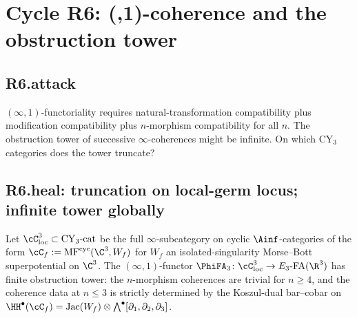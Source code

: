 \section*{Cycle R6: (\infty,1)-coherence and the obstruction tower}

\subsection*{R6.attack}

$(\infty,1)$-functoriality requires natural-transformation compatibility
plus modification compatibility plus $n$-morphism compatibility for all
$n$.  The obstruction tower of successive $\infty$-coherences might be
infinite.  On which CY$_3$ categories does the tower truncate?

\subsection*{R6.heal: truncation on local-germ locus; infinite tower globally}

\begin{proposition}
\label{prop:obstruction-tower-truncation-local}
\ClaimStatusProvedHere
Let $\cC_{\mathrm{loc}}^3 \subset \mathrm{CY}_3\text{-cat}$ be the
full $\infty$-subcategory on cyclic $\Ainf$-categories of the form
$\cC_f := \mathrm{MF}^{\mathrm{cyc}}(\C^3, W_f)$ for $W_f$ an
isolated-singularity Morse--Bott superpotential on $\C^3$.  The
$(\infty,1)$-functor $\PhiFA_3
\colon \cC_{\mathrm{loc}}^3 \to E_3\text{-FA}(\R^3)$ has finite
obstruction tower: the $n$-morphism coherences are trivial for $n \geq 4$,
and the coherence data at $n \leq 3$ is strictly determined by the
Koszul-dual bar--cobar on
$\HH^\bullet(\cC_f) = \mathrm{Jac}(W_f) \otimes \bigwedge^\bullet[\partial_1, \partial_2, \partial_3]$.
\end{proposition}

